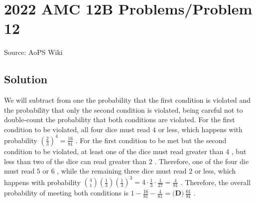 \documentclass[12pt]{article}
\begin{document}
\section*{{2022 AMC 12B Problems/Problem 12}}
Source: AoPS Wiki

\subsection*{Solution}
We will subtract from one the probability that the first condition is violated and the probability that only the second condition is violated, being careful not to double-count the probability that both conditions are violated. For the first condition to be violated, all four dice must read $4$ or less, which happens with probability $\left( \frac23 \right)^4 = \frac{16}{81}$ . For the first condition to be met but the second condition to be violated, at least one of the dice must read greater than $4$ , but less than two of the dice can read greater than $2$ . Therefore, one of the four die must read $5$ or $6$ , while the remaining three dice must read $2$ or less, which happens with probability ${4 \choose 1} \left(\frac13\right) \left(\frac13\right)^3 = 4 \cdot \frac13 \cdot \frac{1}{27} = \frac{4}{81}$ . Therefore, the overall probability of meeting both conditions is $1 - \frac{16}{81} - \frac{4}{81} = \boxed{\textbf{(D)}\ \frac{61}{81}}$ .
\end{document}
